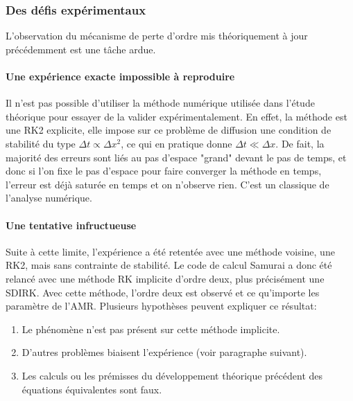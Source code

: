\subsubsection{Des défis expérimentaux}
    L'observation du mécanisme de perte d'ordre mis théoriquement à jour précédemment 
    est une tâche ardue.
    \paragraph{Une expérience exacte impossible à reproduire}
        Il n'est pas possible d'utiliser la méthode numérique utilisée dans l'étude théorique pour essayer de la valider expérimentalement. 
        En effet, la méthode est une RK2 explicite, elle impose sur ce problème de diffusion une condition de stabilité du type $\Delta t \propto \Delta x^2$,
        ce qui en pratique donne $\Delta t \ll \Delta x$. De fait, la majorité des erreurs sont liés au pas d'espace "grand" devant le pas de temps, et donc
        si l'on fixe le pas d'espace pour faire converger la méthode en temps, l'erreur est déjà saturée en temps et on n'observe rien. 
        C'est un classique de l'analyse numérique.
    \paragraph{Une tentative infructueuse}
        Suite à cette limite, l'expérience a été retentée avec une méthode voisine, une RK2, mais sans contrainte de stabilité. 
        Le code de calcul Samurai a donc été relancé avec une méthode RK implicite d'ordre deux, plus précisément une SDIRK.
        Avec cette méthode, l'ordre deux est observé et ce qu'importe les paramètre de l'AMR.
        Plusieurs hypothèses peuvent expliquer ce résultat:
        \begin{enumerate}
            \item Le phénomène n'est pas présent sur cette méthode implicite.
            \item D'autres problèmes biaisent l'expérience (voir paragraphe suivant).
            \item Les calculs ou les prémisses du développement théorique précédent des équations équivalentes sont faux.
        \end{enumerate}
